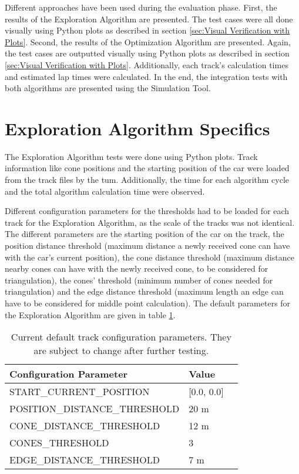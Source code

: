 Different approaches have been used during the evaluation phase. First, the results of the Exploration Algorithm are presented. The test cases were all done visually using Python plots as described in section \ref{sec:Visual Verification with Plots}. Second, the results of the Optimization Algorithm are presented. Again, the test cases are outputted visually using Python plots as described in section \ref{sec:Visual Verification with Plots}. Additionally, each track's calculation times and estimated lap times were calculated. In the end, the integration tests with both algorithms are presented using the Simulation Tool.

\section{Exploration Algorithm Specifics} \label{sec:Exploration Algorithm Specifics}
The Exploration Algorithm tests were done using Python plots. Track information like cone positions and the starting position of the car were loaded from the track files by the \acrlong{tum}. \cite{tumftm_optimization_algoritm} Additionally, the time for each algorithm cycle and the total algorithm calculation time were observed.

Different configuration parameters for the thresholds had to be loaded for each track for the Exploration Algorithm, as the scale of the tracks was not identical. The different parameters are the starting position of the car on the track, the position distance threshold (maximum distance a newly received cone can have with the car's current position), the cone distance threshold (maximum distance nearby cones can have with the newly received cone, to be considered for triangulation), the cones' threshold (minimum number of cones needed for triangulation) and the edge distance threshold (maximum length an edge can have to be considered for middle point calculation). The default parameters for the Exploration Algorithm are given in table \ref{tab:Default Track Config for Exploration Algorithm}.
\begin{table}[H]
    \centering
    \begin{tabular}{|l|l|l|}
        \hline
        \textbf{Configuration Parameter} & \textbf{Value} \\ \hline
        START\_CURRENT\_POSITION         & [0.0, 0.0]     \\ \hline
        POSITION\_DISTANCE\_THRESHOLD    & 20 m           \\ \hline
        CONE\_DISTANCE\_THRESHOLD        & 12 m           \\ \hline
        CONES\_THRESHOLD                 & 3              \\ \hline
        EDGE\_DISTANCE\_THRESHOLD        & 7 m            \\ \hline
    \end{tabular}
    \caption{Current default track configuration parameters. They are subject to change after further testing.}
    \label{tab:Default Track Config for Exploration Algorithm}
\end{table}

